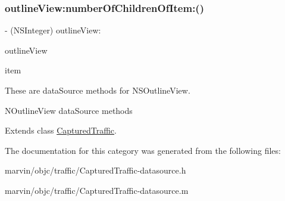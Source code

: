 \subsubsection{\texorpdfstring{outline\+View\+:number\+Of\+Children\+Of\+Item\+:()}{outlineView:numberOfChildrenOfItem:()}}
{\footnotesize\ttfamily -\/ (N\+S\+Integer) outline\+View\+: \begin{DoxyParamCaption}\item[{(N\+S\+Outline\+View $\ast$)}]{outline\+View }\item[{numberOfChildrenOfItem:(id)}]{item }\end{DoxyParamCaption}}



These are data\+Source methods for N\+S\+Outline\+View. 

N\+Outline\+View data\+Source methods 

Extends class \hyperlink{interface_captured_traffic_a0acba96e0a2c8ffacfbb79fa7da8966b}{Captured\+Traffic}.



The documentation for this category was generated from the following files\+:\begin{DoxyCompactItemize}
\item 
marvin/objc/traffic/Captured\+Traffic-\/datasource.\+h\item 
marvin/objc/traffic/Captured\+Traffic-\/datasource.\+m\end{DoxyCompactItemize}
